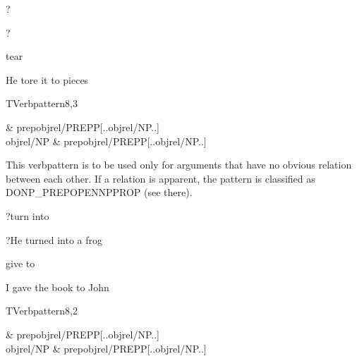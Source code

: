 
\begin{thetadescr}
\evitem ?
\esitem
     \begin{examples}
        \example  ?
     \end{examples}
\end{thetadescr}



\begin{thetadescr}
\evitem  tear
\esitem
     \begin{examples}
        \example He tore it to pieces
     \end{examples}
\end{thetadescr}


\newpage
{}
\begin{vpattern}
 TVerbpattern8,3
\csritem \mbox{}\\
     \begin{csr}
               & prepobjrel/PREPP[..objrel/NP..]\\
     objrel/NP & prepobjrel/PREPP[..objrel/NP..]
     \end{csr}
\remarksitem
This verbpattern is to be used only for arguments that have no obvious relation 
between each other. If a relation is apparent, the pattern is classified as 
DONP\_PREPOPENNPPROP (see there).
\end{vpattern}


\begin{thetadescr}
\evitem ?turn into
\esitem
     \begin{examples}
        \example ?He turned into a frog
     \end{examples}
\end{thetadescr}



\begin{thetadescr}
\evitem give to
\esitem
     \begin{examples}
        \example I gave the book to John
     \end{examples}
\end{thetadescr}


\newpage
{}
\begin{vpattern}
 TVerbpattern8,2
\csritem \mbox{}\\
     \begin{csr}
                & prepobjrel/PREPP[..objrel/NP..]\\
      objrel/NP & prepobjrel/PREPP[..objrel/NP..]
     \end{csr}
\remarksitem
\end{vpattern}

